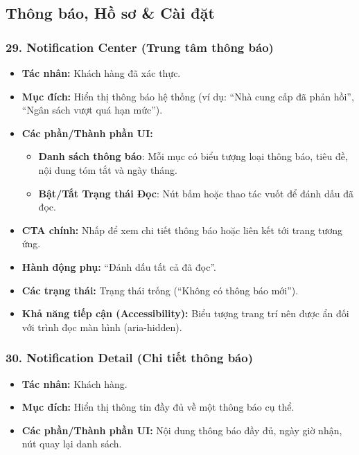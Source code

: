 \documentclass[11pt,a4paper]{article}
\begin{document}
\subsection{Thông báo, Hồ sơ \& Cài đặt}

\subsubsection{29. Notification Center (Trung tâm thông báo)}
\begin{itemize}
    \item \textbf{Tác nhân:} Khách hàng đã xác thực.
    \item \textbf{Mục đích:} Hiển thị thông báo hệ thống (ví dụ: ``Nhà cung cấp đã phản hồi'', ``Ngân sách vượt quá hạn mức'').
    \item \textbf{Các phần/Thành phần UI:}
    \begin{itemize}
        \item \textbf{Danh sách thông báo}: Mỗi mục có biểu tượng loại thông báo, tiêu đề, nội dung tóm tắt và ngày tháng.
        \item \textbf{Bật/Tắt Trạng thái Đọc}: Nút bấm hoặc thao tác vuốt để đánh dấu đã đọc.
    \end{itemize}
    \item \textbf{CTA chính:} Nhấp để xem chi tiết thông báo hoặc liên kết tới trang tương ứng.
    \item \textbf{Hành động phụ:} ``Đánh dấu tất cả đã đọc''.
    \item \textbf{Các trạng thái:} Trạng thái trống (``Không có thông báo mới'').
    \item \textbf{Khả năng tiếp cận (Accessibility):} Biểu tượng trang trí nên được ẩn đối với trình đọc màn hình (aria-hidden).
\end{itemize}

\subsubsection{30. Notification Detail (Chi tiết thông báo)}
\begin{itemize}
    \item \textbf{Tác nhân:} Khách hàng.
    \item \textbf{Mục đích:} Hiển thị thông tin đầy đủ về một thông báo cụ thể.
    \item \textbf{Các phần/Thành phần UI:} Nội dung thông báo đầy đủ, ngày giờ nhận, nút quay lại danh sách.
\end{itemize}
\end{document}

